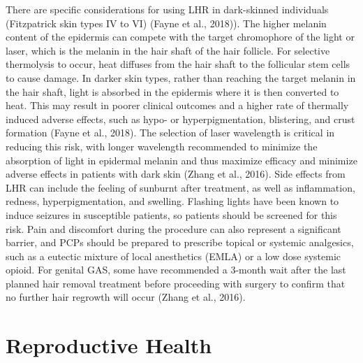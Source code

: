 \documentclass[
]{book}
\begin{document}
There are specific considerations for using
LHR in dark-skinned individuals (Fitzpatrick skin
types IV to VI) (Fayne et al., 2018)). The higher
melanin content of the epidermis can compete
with the target chromophore of the light or laser,
which is the melanin in the hair shaft of the hair
follicle. For selective thermolysis to occur, heat
diffuses from the hair shaft to the follicular stem
cells to cause damage. In darker skin types, rather
than reaching the target melanin in the hair shaft,
light is absorbed in the epidermis where it is
then converted to heat. This may result in poorer
clinical outcomes and a higher rate of thermally
induced adverse effects, such as hypo- or hyperpigmentation, blistering, and crust formation
(Fayne et al., 2018). The selection of laser wavelength is critical in reducing this risk, with longer
wavelength recommended to minimize the
absorption of light in epidermal melanin and thus
maximize efficacy and minimize adverse effects
in patients with dark skin (Zhang et al., 2016).
Side effects from LHR can include the feeling of
sunburnt after treatment, as well as inflammation,
redness, hyperpigmentation, and swelling. Flashing
lights have been known to induce seizures in
susceptible patients, so patients should be
screened for this risk. Pain and discomfort during
the procedure can also represent a significant
barrier, and PCPs should be prepared to prescribe
topical or systemic analgesics, such as a eutectic
mixture of local anesthetics (EMLA) or a low
dose systemic opioid. For genital GAS, some have
recommended a 3-month wait after the last
planned hair removal treatment before proceeding
with surgery to confirm that no further hair
regrowth will occur (Zhang et al., 2016).

\hypertarget{reproductive-health}{%
\chapter{Reproductive Health}\label{reproductive-health}}
\end{document}
